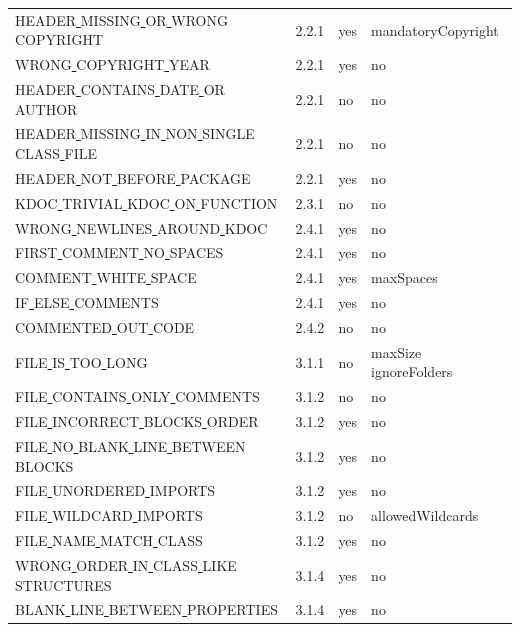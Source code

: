\begin{center}
\begin{longtable}{ |l|p{0.8cm}|p{0.8cm}| p{3cm} | }
HEADER\underline{ }MISSING\underline{ }OR\underline{ }WRONG\underline{ }COPYRIGHT & 2.2.1 &  yes  &  mandatoryCopyright \\
WRONG\underline{ }COPYRIGHT\underline{ }YEAR & 2.2.1 &  yes  &   no  \\
HEADER\underline{ }CONTAINS\underline{ }DATE\underline{ }OR\underline{ }AUTHOR & 2.2.1 &  no  &   no  \\
HEADER\underline{ }MISSING\underline{ }IN\underline{ }NON\underline{ }SINGLE\underline{ }CLASS\underline{ }FILE & 2.2.1 &  no  &   no  \\
HEADER\underline{ }NOT\underline{ }BEFORE\underline{ }PACKAGE & 2.2.1 &  yes  &   no  \\
KDOC\underline{ }TRIVIAL\underline{ }KDOC\underline{ }ON\underline{ }FUNCTION & 2.3.1 &  no  &   no  \\
WRONG\underline{ }NEWLINES\underline{ }AROUND\underline{ }KDOC & 2.4.1 &  yes  &   no  \\
FIRST\underline{ }COMMENT\underline{ }NO\underline{ }SPACES & 2.4.1 &  yes  &   no  \\
COMMENT\underline{ }WHITE\underline{ }SPACE & 2.4.1 &  yes  &   maxSpaces  \\
IF\underline{ }ELSE\underline{ }COMMENTS & 2.4.1 &  yes  &   no  \\
COMMENTED\underline{ }OUT\underline{ }CODE & 2.4.2 &  no  &   no  \\
FILE\underline{ }IS\underline{ }TOO\underline{ }LONG & 3.1.1 &  no  &   maxSize  ignoreFolders  \\
FILE\underline{ }CONTAINS\underline{ }ONLY\underline{ }COMMENTS & 3.1.2 &  no  &   no  \\
FILE\underline{ }INCORRECT\underline{ }BLOCKS\underline{ }ORDER & 3.1.2 &  yes  &   no  \\
FILE\underline{ }NO\underline{ }BLANK\underline{ }LINE\underline{ }BETWEEN\underline{ }BLOCKS & 3.1.2 &  yes  &   no  \\
FILE\underline{ }UNORDERED\underline{ }IMPORTS & 3.1.2 &  yes  &   no  \\
FILE\underline{ }WILDCARD\underline{ }IMPORTS & 3.1.2 &  no  &   allowedWildcards           \\
FILE\underline{ }NAME\underline{ }MATCH\underline{ }CLASS & 3.1.2 &  yes  &   no  \\
WRONG\underline{ }ORDER\underline{ }IN\underline{ }CLASS\underline{ }LIKE\underline{ }STRUCTURES & 3.1.4 &  yes  &   no  \\
BLANK\underline{ }LINE\underline{ }BETWEEN\underline{ }PROPERTIES & 3.1.4 &  yes  &   no  \\

\end{longtable}
\end{center}
